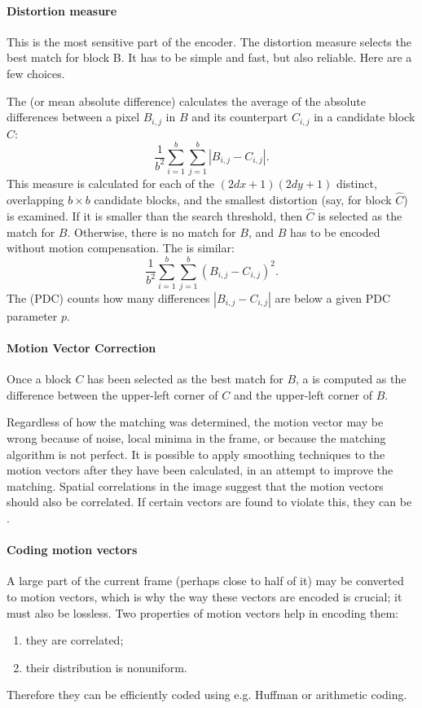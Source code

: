 \documentclass[a4paper, 11pt, openany]{book}
\begin{document}
\paragraph{Distortion measure}
This is the most sensitive part of the encoder. The distortion
measure selects the best match for block B. It has to be simple and fast, but also
reliable. Here are a few choices.

The  (or mean absolute difference) calculates the average of the
absolute differences between a pixel $B_{i,j}$ in $B$ and its counterpart $C_{i,j}$ in a candidate block $C$:
\[
    \frac{1}{b^2} \sum_{i=1}^b \sum_{j=1}^b \left| B_{i,j} - C_{i,j}  \right|.
\]
This measure is calculated for each of the $(2dx+1)(2dy +1)$ distinct, overlapping
$b \times b$ candidate blocks, and the smallest distortion (say, for block $\hat{C}$) is examined. If it is smaller than the search threshold, then $\hat{C}$ is selected as the match for $B$. Otherwise, there is no match for $B$, and $B$ has to be encoded without motion compensation. The  is similar:
\[
    \frac{1}{b^2} \sum_{i=1}^b \sum_{j=1}^b ( B_{i,j} - C_{i,j}  )^2.
\]
The  (PDC) counts how many differences $|B_{i,j} - C_{i,j}|$ are below a given PDC parameter $p$.

\paragraph{Motion Vector Correction}
Once a block $C$ has been selected as the best match for $B$, a  is computed as the difference between the upper-left corner of $C$ and the upper-left corner of $B$.

Regardless of how the matching was determined, the motion vector may be wrong because of noise, local minima in the frame, or because the matching algorithm is not perfect. It is possible to apply smoothing techniques to the motion vectors after they have been calculated, in an attempt to improve the matching. Spatial correlations in the image suggest that the motion vectors should also be correlated. If certain vectors are found to violate this, they can be .

\paragraph{Coding motion vectors}
A large part of the current frame (perhaps close to
half of it) may be converted to motion vectors, which is why the way these vectors are
encoded is crucial; it must also be lossless. Two properties of motion vectors help in
encoding them:
\begin{enumerate}
    \item they are correlated;
    \item their distribution is nonuniform.
\end{enumerate}
Therefore they can be efficiently coded using e.g. Huffman or arithmetic coding.
\end{document}
